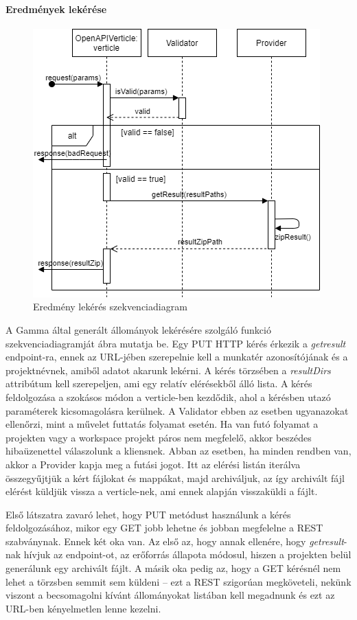 \paragraph{Eredmények lekérése}
\begin{figure}[!ht]
	\includegraphics[keepaspectratio]{figures/get_result_seq.png}
	\caption{Eredmény lekérés szekvenciadiagram}
	\label{fig:getresult}
\end{figure}
A Gamma által generált állományok lekérésére szolgáló funkció szekvenciadiagramját  ábra mutatja be. Egy PUT HTTP kérés érkezik a \textit{getresult} endpoint-ra, ennek az URL-jében szerepelnie kell a munkatér azonosítójának és a projektnévnek, amiből adatot akarunk lekérni. A kérés törzsében a \textit{resultDirs} attribútum kell szerepeljen, ami egy relatív elérésekből álló lista. A kérés feldolgozása a szokásos módon a verticle-ben kezdődik, ahol a kérésben utazó paraméterek kicsomagolásra kerülnek. A Validator ebben az esetben ugyanazokat ellenőrzi, mint a művelet futtatás folyamat esetén. Ha van futó folyamat a projekten vagy a workspace projekt páros nem megfelelő, akkor beszédes hibaüzenettel válaszolunk a kliensnek. Abban az esetben, ha minden rendben van, akkor a Provider kapja meg  a futási jogot. Itt az elérési listán iterálva összegyűjtjük a kért fájlokat és mappákat, majd archiváljuk, az így archivált fájl elérést küldjük vissza a verticle-nek, ami ennek alapján visszaküldi a fájlt.

Első látszatra zavaró lehet, hogy PUT metódust használunk a kérés feldolgozásához, mikor egy GET jobb lehetne és jobban megfelelne a REST szabványnak. Ennek két oka van. Az első az, hogy annak ellenére, hogy \textit{getresult}-nak hívjuk az endpoint-ot, az erőforrás állapota módosul, hiszen a projekten belül generálunk egy archivált fájlt. A másik oka pedig az, hogy a GET kérésnél nem lehet a törzsben semmit sem küldeni -- ezt a REST szigorúan megköveteli, nekünk viszont a becsomagolni kívánt állományokat listában kell megadnunk és ezt az URL-ben kényelmetlen lenne kezelni.


